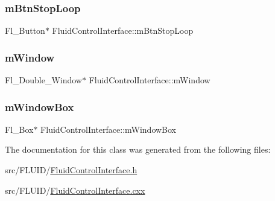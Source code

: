 \subsubsection{\texorpdfstring{m\+Btn\+Stop\+Loop}{mBtnStopLoop}}
{\footnotesize\ttfamily Fl\+\_\+\+Button$\ast$ Fluid\+Control\+Interface\+::m\+Btn\+Stop\+Loop}

\mbox{\label{class_fluid_control_interface_a94da1536108cd2bd24edefd8711ca510}} 
\subsubsection{\texorpdfstring{m\+Window}{mWindow}}
{\footnotesize\ttfamily Fl\+\_\+\+Double\+\_\+\+Window$\ast$ Fluid\+Control\+Interface\+::m\+Window}

\mbox{\label{class_fluid_control_interface_aad9032c096ff2feb1c72f534012282c9}} 
\subsubsection{\texorpdfstring{m\+Window\+Box}{mWindowBox}}
{\footnotesize\ttfamily Fl\+\_\+\+Box$\ast$ Fluid\+Control\+Interface\+::m\+Window\+Box}



The documentation for this class was generated from the following files\+:\begin{DoxyCompactItemize}
\item 
src/\+F\+L\+U\+I\+D/\hyperlink{_fluid_control_interface_8h}{Fluid\+Control\+Interface.\+h}\item 
src/\+F\+L\+U\+I\+D/\hyperlink{_fluid_control_interface_8cxx}{Fluid\+Control\+Interface.\+cxx}\end{DoxyCompactItemize}
